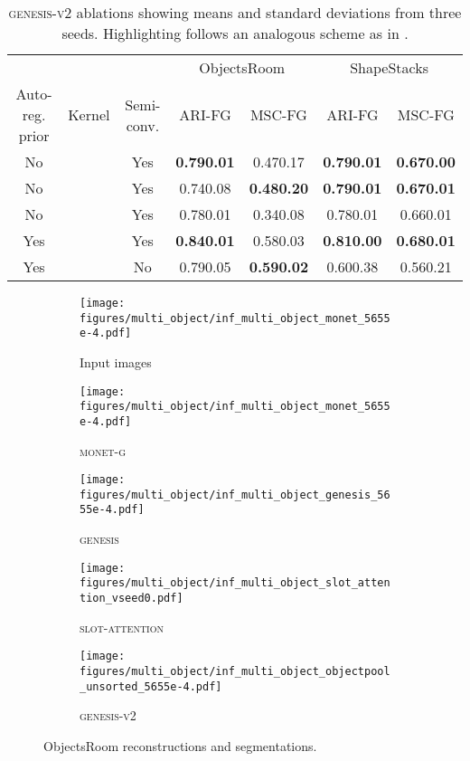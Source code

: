 \documentclass{article}
\begin{document}
\begin{table}[h!]
	\centering
	\caption{\textsc{genesis-v2} ablations showing means and standard deviations from three seeds. Highlighting follows an analogous scheme as in .}
	\begin{tabular}{ccccccc}
		\toprule
		&&& \multicolumn{2}{c}{ObjectsRoom} & \multicolumn{2}{c}{ShapeStacks} \\
		\cmidrule(lr){4-5} \cmidrule(lr){6-7}
		Auto-reg. prior & Kernel & Semi-conv. & ARI-FG & MSC-FG & ARI-FG & MSC-FG \\
		\midrule
		No &  & Yes & \textbf{0.790.01}         & 0.470.17           & \textbf{0.790.01}        & \textbf{0.670.00} \\
		No &  & Yes & 0.740.08           & \textbf{0.480.20}         & \textbf{0.790.01}        & \textbf{0.670.01} \\
		No &  & Yes & 0.780.01           & 0.340.08           & 0.780.01          & 0.660.01\\
		\midrule
		Yes &  & Yes & \textbf{0.840.01}  & {0.580.03}  & \textbf{0.810.00} &
		\textbf{0.680.01}\\
		Yes &  & No & 0.790.05 & \textbf{0.590.02} & 0.600.38 & 0.560.21 \\
		\bottomrule
	\end{tabular}
	\label{tab:gpp:ablations}
\end{table}

\begin{figure}[h!]
	\centering
	\begin{subfigure}{\linewidth}
		\texttt{[image: figures/multi\_object/inf\_multi\_object\_monet\_5655e-4.pdf]}
		\caption{Input images}
		\vspace{6pt}
	\end{subfigure}
	\begin{subfigure}{\linewidth}
		\texttt{[image: figures/multi\_object/inf\_multi\_object\_monet\_5655e-4.pdf]}
		\caption{\textsc{monet-g}}
		\vspace{6pt}
	\end{subfigure}
	\begin{subfigure}{\linewidth}
		\texttt{[image: figures/multi\_object/inf\_multi\_object\_genesis\_5655e-4.pdf]}
		\caption{\textsc{genesis}}
		\vspace{6pt}
	\end{subfigure}
	\begin{subfigure}{\linewidth}
		\texttt{[image: figures/multi\_object/inf\_multi\_object\_slot\_attention\_vseed0.pdf]}
		\caption{\textsc{slot-attention}}
		\vspace{6pt}
	\end{subfigure}
	\begin{subfigure}{\linewidth}
        \texttt{[image: figures/multi\_object/inf\_multi\_object\_objectpool\_unsorted\_5655e-4.pdf]}
		\caption{\textsc{genesis-v2}}
	\end{subfigure}
	\caption{ObjectsRoom reconstructions and segmentations.}
\end{figure}
\end{document}

